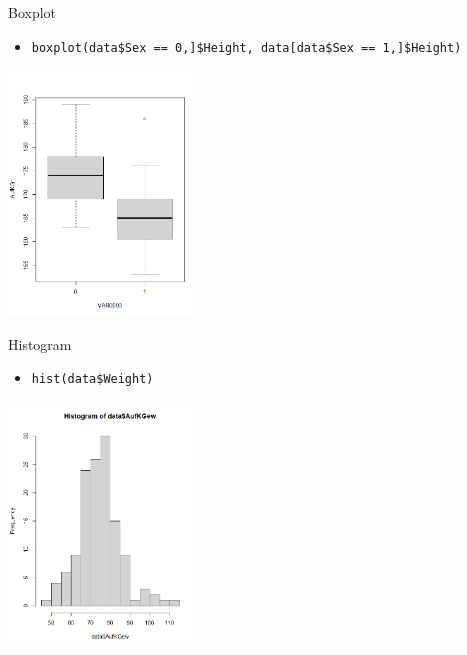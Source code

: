 \documentclass[xcolor=dvipsnames, aspectratio = 169]{beamer}
\begin{document}
\begin{frame}[fragile]{Boxplot}
	\begin{itemize}
		\item \verb+boxplot(data$Sex == 0,]$Height, data[data$Sex == 1,]$Height)+
	\end{itemize}
			
	\begin{center}
		\includegraphics[height=6.5cm]{Boxplot}
	\end{center}
\end{frame}

\begin{frame}[fragile]{Histogram}
	\begin{itemize}
		\item \verb+hist(data$Weight)+
	\end{itemize}
			
	\begin{center}
		\includegraphics[height=6.5cm]{Histogram}
	\end{center}
\end{frame}
\end{document}
